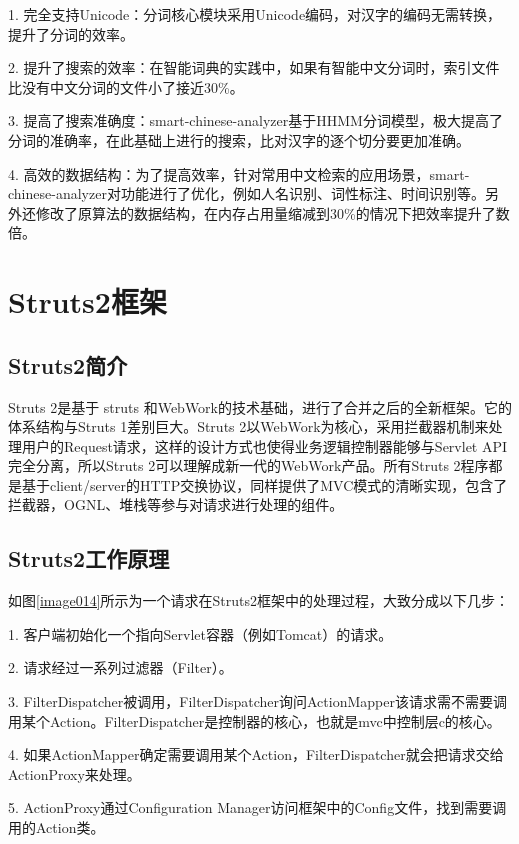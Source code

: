 1. 完全支持Unicode：分词核心模块采用Unicode编码，对汉字的编码无需转换，提升了分词的效率。

2. 提升了搜索的效率：在智能词典的实践中，如果有智能中文分词时，索引文件比没有中文分词的文件小了接近30\%。

3. 提高了搜索准确度：smart-chinese-analyzer基于HHMM分词模型，极大提高了分词的准确率，在此基础上进行的搜索，比对汉字的逐个切分要更加准确。

4. 高效的数据结构：为了提高效率，针对常用中文检索的应用场景，smart-chinese-analyzer对功能进行了优化，例如人名识别、词性标注、时间识别等。另外还修改了原算法的数据结构，在内存占用量缩减到30\%的情况下把效率提升了数倍。

\section{Struts2框架}
\subsection{Struts2简介}
Struts 2是基于 struts 和WebWork的技术基础，进行了合并之后的全新框架。它的体系结构与Struts 1差别巨大。Struts 2以WebWork为核心，采用拦截器机制来处理用户的Request请求，这样的设计方式也使得业务逻辑控制器能够与Servlet API完全分离，所以Struts 2可以理解成新一代的WebWork产品。所有Struts 2程序都是基于client/server的HTTP交换协议，同样提供了MVC模式的清晰实现，包含了拦截器，OGNL、堆栈等参与对请求进行处理的组件。


\subsection{Struts2工作原理}

如图\ref{image014}所示为一个请求在Struts2框架中的处理过程，大致分成以下几步：

1. 客户端初始化一个指向Servlet容器（例如Tomcat）的请求。

2. 请求经过一系列过滤器（Filter）。

3. FilterDispatcher被调用，FilterDispatcher询问ActionMapper该请求需不需要调用某个Action。FilterDispatcher是控制器的核心，也就是mvc中控制层c的核心。

4. 如果ActionMapper确定需要调用某个Action，FilterDispatcher就会把请求交给ActionProxy来处理。

5. ActionProxy通过Configuration Manager访问框架中的Config文件，找到需要调用的Action类。

